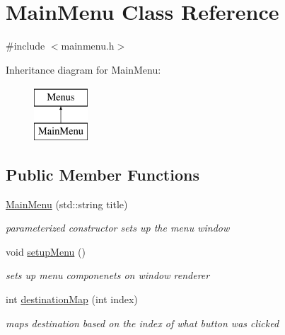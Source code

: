 \hypertarget{class_main_menu}{}\section{Main\+Menu Class Reference}
\label{class_main_menu}


{\ttfamily \#include $<$mainmenu.\+h$>$}

Inheritance diagram for Main\+Menu\+:\begin{figure}[H]
\begin{center}
\leavevmode
\includegraphics[height=2.000000cm]{class_main_menu}
\end{center}
\end{figure}
\subsection*{Public Member Functions}
\begin{DoxyCompactItemize}
\item 
\hypertarget{class_main_menu_a055c12811c77cd472d0fdd93bbb12f04}{}\label{class_main_menu_a055c12811c77cd472d0fdd93bbb12f04} 
\hyperlink{class_main_menu_a055c12811c77cd472d0fdd93bbb12f04}{Main\+Menu} (std\+::string title)
\begin{DoxyCompactList}\small\item\em parameterized constructor sets up the menu window \end{DoxyCompactList}\item 
\hypertarget{class_main_menu_abb8bdd0b1f38e54afb8998e3ccb15392}{}\label{class_main_menu_abb8bdd0b1f38e54afb8998e3ccb15392} 
void \hyperlink{class_main_menu_abb8bdd0b1f38e54afb8998e3ccb15392}{setup\+Menu} ()
\begin{DoxyCompactList}\small\item\em sets up menu componenets on window renderer \end{DoxyCompactList}\item 
\hypertarget{class_main_menu_a8bbfc6ae7efd828d94429a85f20aafc7}{}\label{class_main_menu_a8bbfc6ae7efd828d94429a85f20aafc7} 
int \hyperlink{class_main_menu_a8bbfc6ae7efd828d94429a85f20aafc7}{destination\+Map} (int index)
\begin{DoxyCompactList}\small\item\em maps destination based on the index of what button was clicked \end{DoxyCompactList}\end{DoxyCompactItemize}
